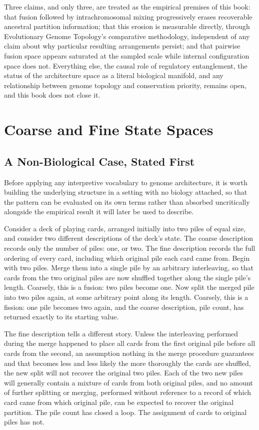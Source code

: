 \documentclass[11pt]{book}
\begin{document}
Three claims, and only three, are treated as the empirical premises of this book: that fusion followed by intrachromosomal mixing progressively erases recoverable ancestral partition information; that this erosion is measurable directly, through Evolutionary Genome Topology's comparative methodology, independent of any claim about why particular resulting arrangements persist; and that pairwise fusion space appears saturated at the sampled scale while internal configuration space does not. Everything else, the causal role of regulatory entanglement, the status of the architecture space as a literal biological manifold, and any relationship between genome topology and conservation priority, remains open, and this book does not close it.

\chapter{Coarse and Fine State Spaces}

\section{A Non-Biological Case, Stated First}

Before applying any interpretive vocabulary to genome architecture, it is worth building the underlying structure in a setting with no biology attached, so that the pattern can be evaluated on its own terms rather than absorbed uncritically alongside the empirical result it will later be used to describe.

Consider a deck of playing cards, arranged initially into two piles of equal size, and consider two different descriptions of the deck's state. The coarse description records only the number of piles: one, or two. The fine description records the full ordering of every card, including which original pile each card came from. Begin with two piles. Merge them into a single pile by an arbitrary interleaving, so that cards from the two original piles are now shuffled together along the single pile's length. Coarsely, this is a fusion: two piles become one. Now split the merged pile into two piles again, at some arbitrary point along its length. Coarsely, this is a fission: one pile becomes two again, and the coarse description, pile count, has returned exactly to its starting value.

The fine description tells a different story. Unless the interleaving performed during the merge happened to place all cards from the first original pile before all cards from the second, an assumption nothing in the merge procedure guarantees and that becomes less and less likely the more thoroughly the cards are shuffled, the new split will not recover the original two piles. Each of the two new piles will generally contain a mixture of cards from both original piles, and no amount of further splitting or merging, performed without reference to a record of which card came from which original pile, can be expected to recover the original partition. The pile count has closed a loop. The assignment of cards to original piles has not.
\end{document}
